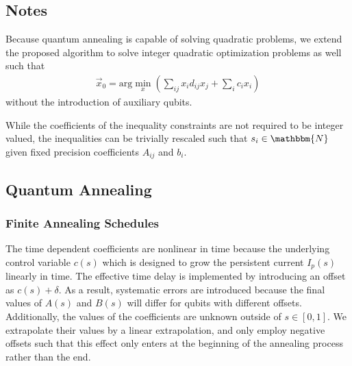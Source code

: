 \documentclass[prd,twocolumn,tightenlines,preprintnumbers,showpacs,superscriptaddress,notitlepage,nofootinbib,eqsecnum,floatfix,longbibliography,aps,10pt]{revtex4-2}
\begin{document}
\subsection{Notes}
\label{sec:methods:ilp:notes}

Because quantum annealing is capable of solving quadratic problems, we extend the proposed algorithm to solve integer quadratic optimization problems as well such that
\begin{align}
 \vec x_0 = \mathrm{arg}\min\limits_{x}\left(\sum_{ij} x_i d_{ij} x_j + \sum_i c_i x_i\right)
\end{align}
without the introduction of auxiliary qubits.

While the coefficients of the inequality constraints are not required to be integer valued, the inequalities can be trivially rescaled such that $s_i \in \mathbbm{N}$ given fixed precision coefficients $A_{ij}$ and $b_i$.


\subsection{Quantum Annealing}
\label{sec:methods:annealing}

\subsubsection{Finite Annealing Schedules}
\label{sec:methods:annealing-schedule}
The time dependent coefficients are nonlinear in time because the underlying control variable $c(s)$ which is designed to grow the persistent current $I_p(s)$ linearly in time.
The effective time delay is implemented by introducing an offset as $c(s) + \delta$.
As a result, systematic errors are introduced because the final values of $A(s)$ and $B(s)$ will differ for qubits with different offsets.
Additionally, the values of the coefficients are unknown outside of $s\in [0, 1]$.
We extrapolate their values by a linear extrapolation, and only employ negative offsets such that this effect only enters at the beginning of the annealing process rather than the end.
\end{document}
